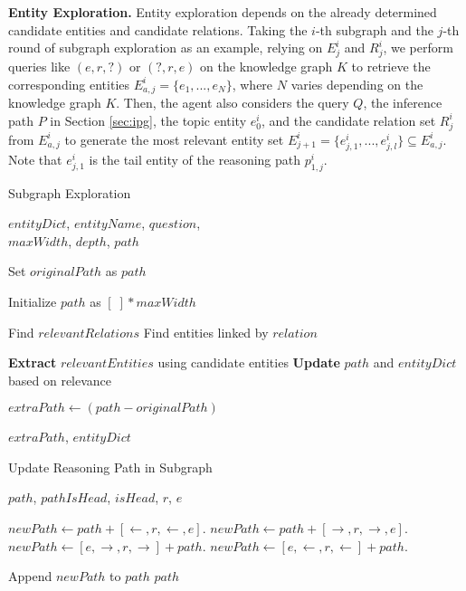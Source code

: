 \textbf{Entity Exploration.}
Entity exploration depends on the already determined candidate entities and candidate relations.
Taking the $i$-th subgraph and the $j$-th round of subgraph exploration as an example, relying on $E_{j}^{i}$ and $R_{j}^{i}$, we perform queries like $(e, r, ?)$ or $(?, r, e)$ on the knowledge graph $K$ to retrieve the corresponding entities $E_{a,j}^{i} = \{e_1, ..., e_N\}$, where $N$ varies depending on the knowledge graph $K$.
Then, the agent also considers the query $Q$, the inference path $P$ in Section \ref{sec:ipg}, the topic entity $e_{0}^i$, and the candidate relation set $R_{j}^{i}$ from $E_{a,j}^{i}$ to generate the most relevant entity set $E_{j+1}^{i} = \{e_{j,1}^i, ..., e_{j,l}^i\} \subseteq E_{a,j}^{i}$. Note that $e_{j,1}^i$ is the tail entity of the reasoning path $p_{1,j}^i$.
\begin{algorithm}[t]
\caption{Subgraph Exploration}
\begin{algorithmic}[1]
\REQUIRE $entityDict$, $entityName$, $question$, \\ $maxWidth$, $depth$, $path$

\STATE Set $originalPath$ as $path$

    \STATE Initialize $path$ as $[ \;]*maxWidth$
\ENDIF

    \STATE Find $relevantRelations$
        \STATE Find entities linked by $relation$
    \ENDFOR
\ENDFOR

\STATE \textbf{Extract} $relevantEntities$ using candidate entities
\STATE \textbf{Update} $path$ and $entityDict$ based on relevance

\STATE $extraPath \leftarrow (path - originalPath)$

\RETURN $extraPath$, $entityDict$

\end{algorithmic}
\end{algorithm}
\begin{algorithm}[t]
    \caption{Update Reasoning Path in Subgraph}\label{alg:update_path}
    
    \begin{algorithmic}[1]
    \REQUIRE $path$, $pathIsHead$, $isHead$, $r$, $e$
    
            \STATE $newPath \gets path + [\leftarrow, r, \leftarrow, e]$.
        \ELSE
            \STATE $newPath \gets path + [\rightarrow, r, \rightarrow, e]$.
        \ENDIF
    \ELSE
            \STATE $newPath \gets [e, \rightarrow, r, \rightarrow] + path$.
        \ELSE
            \STATE $newPath \gets [e, \leftarrow, r, \leftarrow] + path$.
        \ENDIF
    \ENDIF
    
    \STATE Append $newPath$ to $path$
    \RETURN $path$
    
    \end{algorithmic}
\end{algorithm}


